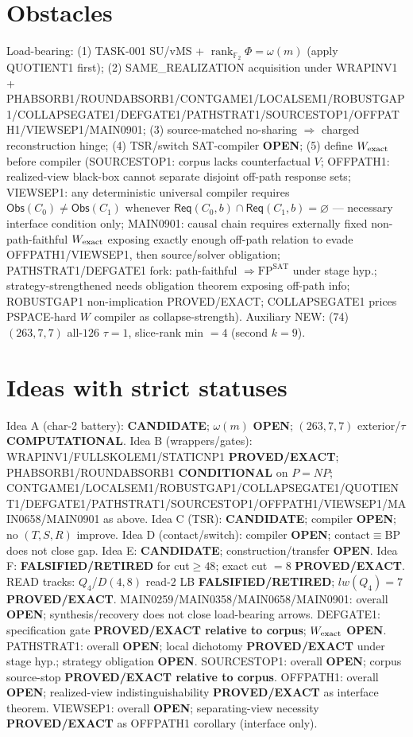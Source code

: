 \documentclass[11pt]{article}
\begin{document}
\section*{Obstacles}
Load-bearing: (1) TASK-001 SU/vMS + $\operatorname{rank}_{\mathbb F_2}\Phi=\omega(m)$ (apply QUOTIENT1 first);
(2) SAME\_REALIZATION acquisition under WRAPINV1 + PHABSORB1/ROUNDABSORB1/CONTGAME1/LOCALSEM1/ROBUSTGAP1/COLLAPSEGATE1/DEFGATE1/PATHSTRAT1/SOURCESTOP1/OFFPATH1/VIEWSEP1/MAIN0901;
(3) source-matched no-sharing $\Rightarrow$ charged reconstruction hinge;
(4) TSR/switch SAT-compiler \textbf{OPEN};
(5) define $W_{\rm exact}$ before compiler (SOURCESTOP1: corpus lacks counterfactual $V$;
OFFPATH1: realized-view black-box cannot separate disjoint off-path response sets;
VIEWSEP1: any deterministic universal compiler requires $\mathsf{Obs}(C_0)\ne\mathsf{Obs}(C_1)$
whenever $\mathsf{Req}(C_0,b)\cap\mathsf{Req}(C_1,b)=\varnothing$ --- necessary interface condition only;
MAIN0901: causal chain requires externally fixed non-path-faithful $W_{\rm exact}$ exposing
exactly enough off-path relation to evade OFFPATH1/VIEWSEP1, then source/solver obligation;
PATHSTRAT1/DEFGATE1 fork: path-faithful $\Rightarrow\mathrm{FP}^{\mathrm{SAT}}$ under stage hyp.;
strategy-strengthened needs obligation theorem exposing off-path info;
ROBUSTGAP1 non-implication PROVED/EXACT; COLLAPSEGATE1 prices PSPACE-hard $W$ compiler as collapse-strength).
Auxiliary NEW: (74) $(263,7,7)$ all-$126$ $\tau{=}1$, slice-rank min $=4$ (second $k{=}9$).

\section*{Ideas with strict statuses}
Idea A (char-2 battery): \textbf{CANDIDATE}; $\omega(m)$ \textbf{OPEN}; $(263,7,7)$ exterior/$\tau$ \textbf{COMPUTATIONAL}.
Idea B (wrappers/gates): WRAPINV1/FULLSKOLEM1/STATICNP1 \textbf{PROVED/EXACT};
PHABSORB1/ROUNDABSORB1 \textbf{CONDITIONAL} on $P=NP$;
CONTGAME1/LOCALSEM1/ROBUSTGAP1/COLLAPSEGATE1/QUOTIENT1/DEFGATE1/PATHSTRAT1/SOURCESTOP1/OFFPATH1/VIEWSEP1/MAIN0658/MAIN0901 as above.
Idea C (TSR): \textbf{CANDIDATE}; compiler \textbf{OPEN}; no $(T,S,R)$ improve.
Idea D (contact/switch): compiler \textbf{OPEN}; contact$\equiv$BP does not close gap.
Idea E: \textbf{CANDIDATE}; construction/transfer \textbf{OPEN}.
Idea F: \textbf{FALSIFIED/RETIRED} for cut$\ge48$; exact cut $=8$ \textbf{PROVED/EXACT}.
READ tracks: $Q_4$/$D(4,8)$ read-$2$ LB \textbf{FALSIFIED/RETIRED}; $lw(Q_4)=7$ \textbf{PROVED/EXACT}.
MAIN0259/MAIN0358/MAIN0658/MAIN0901: overall \textbf{OPEN}; synthesis/recovery does not close load-bearing arrows.
DEFGATE1: specification gate \textbf{PROVED/EXACT relative to corpus}; $W_{\rm exact}$ \textbf{OPEN}.
PATHSTRAT1: overall \textbf{OPEN}; local dichotomy \textbf{PROVED/EXACT} under stage hyp.; strategy obligation \textbf{OPEN}.
SOURCESTOP1: overall \textbf{OPEN}; corpus source-stop \textbf{PROVED/EXACT relative to corpus}.
OFFPATH1: overall \textbf{OPEN}; realized-view indistinguishability \textbf{PROVED/EXACT} as interface theorem.
VIEWSEP1: overall \textbf{OPEN}; separating-view necessity \textbf{PROVED/EXACT} as OFFPATH1 corollary (interface only).
\end{document}
